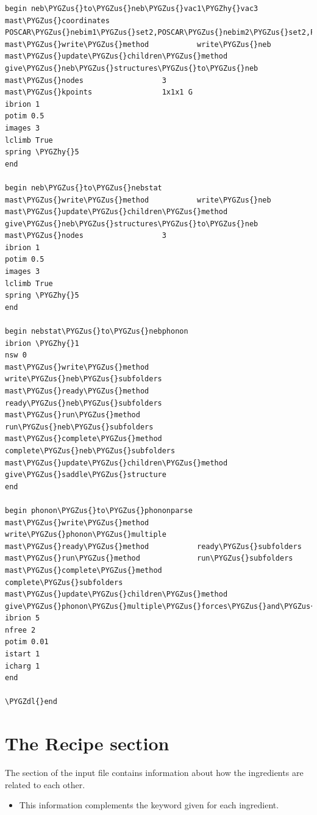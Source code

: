 \documentclass[letterpaper,10pt,english]{sphinxmanual}
\def\PYGZus{\char`\_}
\def\PYGZdl{\char`\$}
\def\PYGZhy{\char`\-}
\begin{document}
\begin{Verbatim}[commandchars=\\\{\}]
begin neb\PYGZus{}to\PYGZus{}neb\PYGZus{}vac1\PYGZhy{}vac3
mast\PYGZus{}coordinates            POSCAR\PYGZus{}nebim1\PYGZus{}set2,POSCAR\PYGZus{}nebim2\PYGZus{}set2,POSCAR\PYGZus{}nebim3\PYGZus{}set2
mast\PYGZus{}write\PYGZus{}method           write\PYGZus{}neb
mast\PYGZus{}update\PYGZus{}children\PYGZus{}method  give\PYGZus{}neb\PYGZus{}structures\PYGZus{}to\PYGZus{}neb
mast\PYGZus{}nodes                  3
mast\PYGZus{}kpoints                1x1x1 G
ibrion 1
potim 0.5
images 3
lclimb True
spring \PYGZhy{}5
end

begin neb\PYGZus{}to\PYGZus{}nebstat
mast\PYGZus{}write\PYGZus{}method           write\PYGZus{}neb
mast\PYGZus{}update\PYGZus{}children\PYGZus{}method  give\PYGZus{}neb\PYGZus{}structures\PYGZus{}to\PYGZus{}neb
mast\PYGZus{}nodes                  3
ibrion 1
potim 0.5
images 3
lclimb True
spring \PYGZhy{}5
end

begin nebstat\PYGZus{}to\PYGZus{}nebphonon
ibrion \PYGZhy{}1
nsw 0
mast\PYGZus{}write\PYGZus{}method           write\PYGZus{}neb\PYGZus{}subfolders
mast\PYGZus{}ready\PYGZus{}method           ready\PYGZus{}neb\PYGZus{}subfolders
mast\PYGZus{}run\PYGZus{}method             run\PYGZus{}neb\PYGZus{}subfolders
mast\PYGZus{}complete\PYGZus{}method        complete\PYGZus{}neb\PYGZus{}subfolders
mast\PYGZus{}update\PYGZus{}children\PYGZus{}method  give\PYGZus{}saddle\PYGZus{}structure
end

begin phonon\PYGZus{}to\PYGZus{}phononparse
mast\PYGZus{}write\PYGZus{}method           write\PYGZus{}phonon\PYGZus{}multiple
mast\PYGZus{}ready\PYGZus{}method           ready\PYGZus{}subfolders
mast\PYGZus{}run\PYGZus{}method             run\PYGZus{}subfolders
mast\PYGZus{}complete\PYGZus{}method        complete\PYGZus{}subfolders
mast\PYGZus{}update\PYGZus{}children\PYGZus{}method  give\PYGZus{}phonon\PYGZus{}multiple\PYGZus{}forces\PYGZus{}and\PYGZus{}displacements
ibrion 5
nfree 2
potim 0.01
istart 1
icharg 1
end

\PYGZdl{}end
\end{Verbatim}


\section{The Recipe section}
\label{3_1_3_recipe:the-recipe-section}\label{3_1_3_recipe::doc}
The  section of the input file contains information about how the ingredients are related to each other.
\begin{itemize}
\item {} 
This information complements the  keyword given for each ingredient.

\end{itemize}
\end{document}
